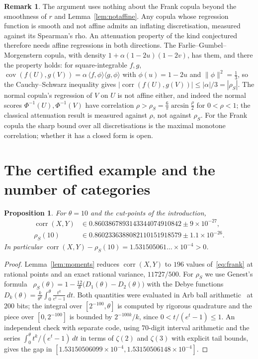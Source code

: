 \documentclass[11pt]{amsart}
\newtheorem{prop}[thm]{Proposition}
\theoremstyle{definition}
\newtheorem{remark}[thm]{Remark}
\DeclareMathOperator{\corr}{corr}
\DeclareMathOperator{\cov}{cov}
\newcommand{\rs}{\rho_S}
\begin{document}
\begin{remark}
The argument uses nothing about the Frank copula beyond the smoothness of $r$ and Lemma~\ref{lem:notaffine}. Any
copula whose regression function is smooth and not affine admits an inflating discretisation, measured against its
Spearman's rho. An attenuation property of the kind conjectured therefore needs affine regressions in both
directions. The Farlie--Gumbel--Morgenstern copula, with density $1+\alpha(1-2u)(1-2v)$, has them, and there the property holds:
for square-integrable $f,g$, $\cov(f(U),g(V))=\alpha\,\langle f,\phi\rangle\langle g,\phi\rangle$ with
$\phi(u)=1-2u$ and $\|\phi\|^2=\tfrac13$, so the Cauchy--Schwarz inequality gives
$|\corr(f(U),g(V))|\le|\alpha|/3=|\rs|$. The normal copula's regression of $V$ on $U$ is not affine either, and indeed the normal scores
$\Phi^{-1}(U),\Phi^{-1}(V)$ have correlation $\rho>\rs=\tfrac6\pi\arcsin\tfrac\rho2$ for $0<\rho<1$; the classical
attenuation result is measured against $\rho$, not against $\rs$. For the Frank copula the sharp bound over all
discretisations is the maximal monotone correlation; whether it has a closed form is open.
\end{remark}

\section{The certified example and the number of categories}\label{sec:numerics}

\begin{prop}\label{prop:cert}
For $\theta=10$ and the cut-points of the introduction,
\begin{align*}
\corr(X,Y)&\in0.8603867893143344074910842\pm9\times10^{-27},\\
\rs(10)&\in0.8602336388082110151918579\pm1.1\times10^{-26}.
\end{align*}
In particular $\corr(X,Y)-\rs(10)=1.531505061\ldots\times10^{-4}>0$.
\end{prop}

\begin{proof}
Lemma~\ref{lem:moments} reduces $\corr(X,Y)$ to $196$ values of~\eqref{eq:frank} at rational points and an exact
rational variance, $11727/500$. For $\rs$ we use Genest's formula~\cite{Genest}
$\rs(\theta)=1-\tfrac{12}{\theta}\bigl(D_1(\theta)-D_2(\theta)\bigr)$ with the Debye functions
$D_k(\theta)=\tfrac{k}{\theta^k}\int_0^\theta\tfrac{t^k}{e^t-1}\,dt$. Both quantities were evaluated in Arb ball
arithmetic~\cite{Arb} at 200 bits; the integral over $[2^{-100},\theta]$ is computed by rigorous quadrature and the
piece over $[0,2^{-100}]$ is bounded by $2^{-100k}/k$, since $0<t/(e^t-1)\le1$. An independent check with separate
code, using 70-digit interval arithmetic and the series $\int_0^\theta t^k/(e^t-1)\,dt$ in terms of $\zeta(2)$ and
$\zeta(3)$ with explicit tail bounds, gives the gap in $[1.53150506099\times10^{-4},1.53150506148\times10^{-4}]$.
\end{proof}
\end{document}
